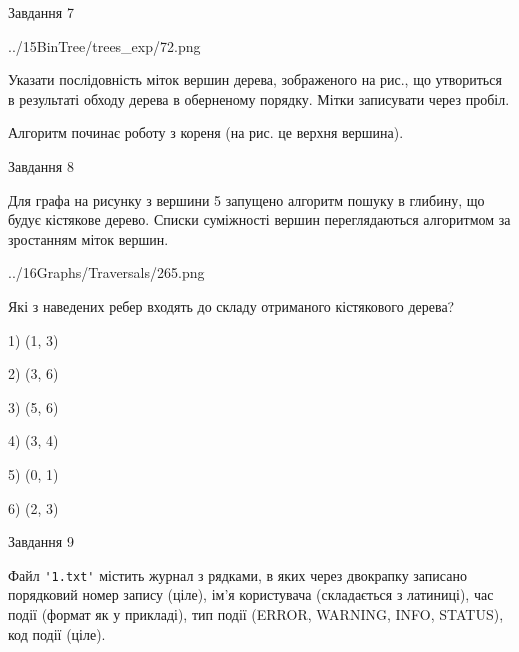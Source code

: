 \documentclass[12pt, ukrainian]{article}
\def\code#1{\Verb!#1!}
\begin{document}
{\vspace{10mm}\par

\newpage
\begin{minipage}[t]{9.7cm}
               
{\begin{center}Завдання {7}\end{center}}
\vspace{-4mm}

\begin{center}
	{../15BinTree/trees_exp/72.png}
\end{center}
Указати послідовність міток вершин дерева, зображеного на рис., що утвориться в результаті обходу дерева в оберненому порядку. Мітки записувати через пробіл.\par Алгоритм починає роботу з кореня (на рис. це верхня вершина).\par

\end{minipage}
\vline \hspace{8mm}
\begin{minipage}[t]{8.0cm}
               
{\begin{center}Завдання {8}\end{center}}
\vspace{-4mm}
Для графа на рисунку з вершини 5 запущено алгоритм пошуку в глибину, що будує кістякове дерево. Списки суміжності вершин переглядаються алгоритмом за зростанням міток вершин.\par
\begin{center}
	{../16Graphs/Traversals/265.png}
\end{center}
\par Які з наведених ребер входять до складу отриманого кістякового дерева?\par
1) (1, 3)\par
2) (3, 6)\par
3) (5, 6)\par
4) (3, 4)\par
5) (0, 1)\par
6) (2, 3)\par
{\vskip 15pt} \par

\end{minipage}

               
{\begin{center}Завдання {9}\end{center}}
\vspace{-4mm}
Файл \code{'1.txt'} містить журнал з рядками, в яких через двокрапку записано поряд\-ко\-вий номер запису (ціле), ім'я користувача (складається з латиниці), час події (фор\-мат як у прикладі), тип події (ERROR, WARNING, INFO, STATUS), код події (ціле).

}
\end{document}
